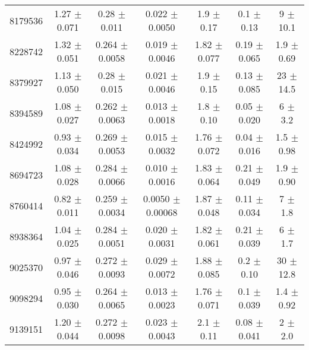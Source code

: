\documentclass[epjCONF,columns]{svjour} %
\begin{document}
\begin{table*}
\begin{tabular}{c|cccccc}
8179536  &        1.27   $\pm$  0.071    &        0.28   $\pm$  0.011    &        0.022  $\pm$  0.0050   &        1.9    $\pm$  0.17     &        0.1    $\pm$  0.13     &        9      $\pm$ 10.1      \\
8228742  &        1.32   $\pm$  0.051    &        0.264  $\pm$  0.0058   &        0.019  $\pm$  0.0046   &        1.82   $\pm$  0.077    &        0.19   $\pm$  0.065    &        1.9    $\pm$  0.69     \\
8379927  &        1.13   $\pm$  0.050    &        0.28   $\pm$  0.015    &        0.021  $\pm$  0.0046   &        1.9    $\pm$  0.15     &        0.13   $\pm$  0.085    &       23      $\pm$ 14.5      \\
8394589  &        1.08   $\pm$  0.027    &        0.262  $\pm$  0.0063   &        0.013  $\pm$  0.0018   &        1.8    $\pm$  0.10     &        0.05   $\pm$  0.020    &        6      $\pm$  3.2      \\
8424992  &        0.93   $\pm$  0.034    &        0.269  $\pm$  0.0053   &        0.015  $\pm$  0.0032   &        1.76   $\pm$  0.072    &        0.04   $\pm$  0.016    &        1.5    $\pm$  0.98     \\
8694723  &        1.08   $\pm$  0.028    &        0.284  $\pm$  0.0066   &        0.010  $\pm$  0.0016   &        1.83   $\pm$  0.064    &        0.21   $\pm$  0.049    &        1.9    $\pm$  0.90     \\
8760414  &        0.82   $\pm$  0.011    &        0.259  $\pm$  0.0034   &        0.0050 $\pm$  0.00068  &        1.87   $\pm$  0.048    &        0.11   $\pm$  0.034    &        7      $\pm$  1.8      \\
8938364  &        1.04   $\pm$  0.025    &        0.284  $\pm$  0.0051   &        0.020  $\pm$  0.0031   &        1.82   $\pm$  0.061    &        0.21   $\pm$  0.039    &        6      $\pm$  1.7      \\
9025370  &        0.97   $\pm$  0.046    &        0.272  $\pm$  0.0093   &        0.029  $\pm$  0.0072   &        1.88   $\pm$  0.085    &        0.2    $\pm$  0.10     &       30      $\pm$  12.8     \\
9098294  &        0.95   $\pm$  0.030    &        0.264  $\pm$  0.0065   &        0.013  $\pm$  0.0023   &        1.76   $\pm$  0.071    &        0.1    $\pm$  0.039    &        1.4    $\pm$  0.92     \\
9139151  &        1.20   $\pm$  0.044    &        0.272  $\pm$  0.0098   &        0.023  $\pm$  0.0043   &        2.1    $\pm$  0.11     &        0.08   $\pm$  0.041    &        2      $\pm$  2.0      \\

\end{tabular}
\end{table*}
\end{document}
